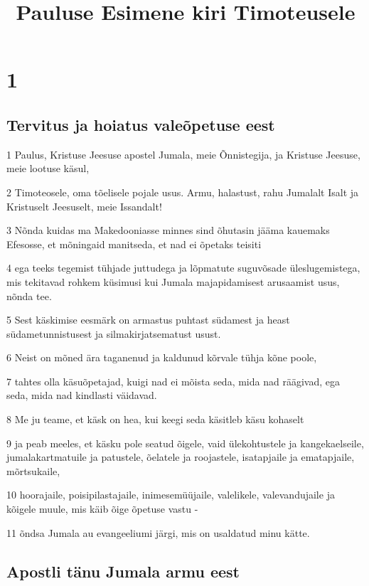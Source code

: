 

\title{Pauluse Esimene kiri Timoteusele}

\chapter{1}

\section*{Tervitus ja hoiatus valeõpetuse eest}

\par 1 Paulus, Kristuse Jeesuse apostel Jumala, meie Õnnistegija, ja Kristuse Jeesuse, meie lootuse käsul,
\par 2 Timoteosele, oma tõelisele pojale usus. Armu, halastust, rahu Jumalalt Isalt ja Kristuselt Jeesuselt, meie Issandalt!
\par 3 Nõnda kuidas ma Makedooniasse minnes sind õhutasin jääma kauemaks Efesosse, et mõningaid manitseda, et nad ei õpetaks teisiti
\par 4 ega teeks tegemist tühjade juttudega ja lõpmatute suguvõsade üleslugemistega, mis tekitavad rohkem küsimusi kui Jumala majapidamisest arusaamist usus, nõnda tee.
\par 5 Sest käskimise eesmärk on armastus puhtast südamest ja heast südametunnistusest ja silmakirjatsematust usust.
\par 6 Neist on mõned ära taganenud ja kaldunud kõrvale tühja kõne poole,
\par 7 tahtes olla käsuõpetajad, kuigi nad ei mõista seda, mida nad räägivad, ega seda, mida nad kindlasti väidavad.
\par 8 Me ju teame, et käsk on hea, kui keegi seda käsitleb käsu kohaselt
\par 9 ja peab meeles, et käsku pole seatud õigele, vaid ülekohtustele ja kangekaelseile, jumalakartmatuile ja patustele, õelatele ja roojastele, isatapjaile ja ematapjaile, mõrtsukaile,
\par 10 hoorajaile, poisipilastajaile, inimesemüüjaile, valelikele, valevandujaile ja kõigele muule, mis käib õige õpetuse vastu -
\par 11 õndsa Jumala au evangeeliumi järgi, mis on usaldatud minu kätte.

\section*{Apostli tänu Jumala armu eest}


